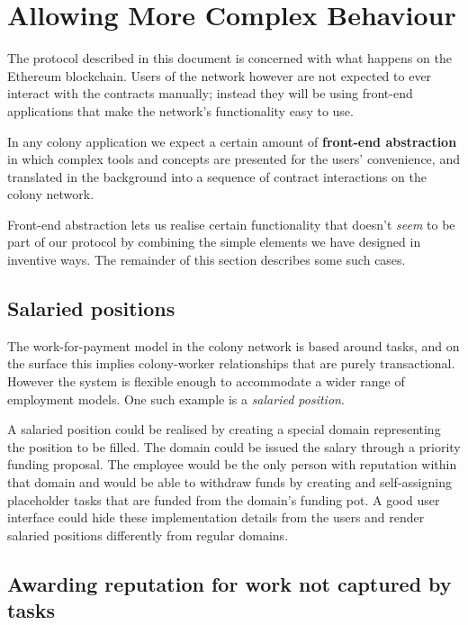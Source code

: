 \section{Allowing More Complex Behaviour}\label{sec:special-cases}


The protocol described in this document is concerned with what happens on the Ethereum blockchain. Users of the network however are not expected to ever interact with the contracts manually; instead they will be using front-end applications that make the network's functionality easy to use.

In any colony application we expect a certain amount of \textbf{front-end abstraction} in which complex tools and concepts are presented for the users' convenience, and translated in the background into a sequence of contract interactions on the colony network.

Front-end abstraction lets us realise certain functionality that doesn't \emph{seem} to be part of our protocol by combining the simple elements we have designed in inventive ways. The remainder of this section describes some such cases.

\subsection{Salaried positions}\label{sec:salary}

The work-for-payment model in the colony network is based around tasks, and on the surface this implies colony-worker relationships that are purely transactional. However the system is flexible enough to accommodate a wider range of employment models. One such example is a \emph{salaried position}.

A salaried position could be realised by creating a special domain representing the position to be filled. The domain could be issued the salary through a priority funding proposal. The employee would be the only person with reputation within that domain and would be able to withdraw funds by creating and self-assigning placeholder tasks that are funded from the domain's funding pot. A good user interface could hide these implementation details from the users and render salaried positions differently from regular domains.

\subsection{Awarding reputation for work not captured by tasks}

